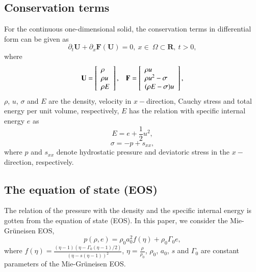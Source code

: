\documentclass[review]{elsarticle}
\begin{document}
\subsection{Conservation terms}
For  the  continuous one-dimensional solid, the conservation terms  in differential form can be  given as
\begin{equation*}
\partial_t \mathbf{{U}} + \partial _x \bm{F}(\mathbf{{U}}) = 0, \   x \in \   \Omega \subset \mathbf{R}, \  t>0,
\end{equation*}
where
\begin{equation}
  \mathbf{U} = \left[ \begin{array}{l}
      \rho \\
      \rho u \\
      \rho  E \\
    \end{array}
  \right],
  \hspace{0.3cm}
  \mathbf{F} = \left[ \begin{array}{l}
      \rho u \\
      \rho u^2 -\sigma\\
      (\rho E -\sigma)u\\
  \end{array} \right],
\end{equation}
$\rho$, $u$, $\sigma$ and $E$ are  the density, velocity in $x-$direction, Cauchy stress and total energy per unit volume, respectively, $E$ has the relation with specific internal energy $e$ as
\begin{equation}
  E = e+\frac{1}{2}u^2,
\end{equation}
\begin{equation}
  \sigma = -p +s_{xx},
\end{equation}
where $p$ and $s_{xx}$ denote hydrostatic pressure and deviatoric stress in the $x-$ direction, respectively.

\subsection{The equation of state (EOS)}

The relation of the pressure with  the density and the specific internal energy is gotten from the equation of state (EOS). In this paper, we consider the Mie-Gr\"uneisen EOS,
\begin{equation}\label{eq:mie}
  p(\rho,e) = \rho_0 a_0^2f(\eta)+ \rho_0 \Gamma_0 e,
\end{equation}
where $f(\eta) = \frac{(\eta-1)(\eta-\Gamma_0(\eta-1)/2)}{(\eta-s(\eta-1))^2}$, $\eta = \frac{\rho}{\rho_0}$, $\rho_0$, $a_0$, $s$ and $\Gamma_0$ are constant parameters of the Mie-Gr\"uneisen EOS.
\end{document}
